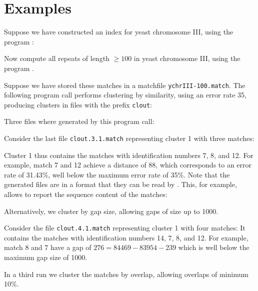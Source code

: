 \documentclass[12pt]{article}
\newcommand{\EXECUTE}[1]{}
\begin{document}
\section{Examples}

Suppose we have constructed an index for yeast chromosome III, using the
program \MKV:

\EXECUTE{mkvtree -dna -db ychrIII.fna -v -tis -ois -bwt -suf -lcp}

Now compute all repeats of length \(\geq 100\) in yeast chromosome III, using
the program \VM.

\EXECUTE{vmatch -l 100 ychrIII.fna}

Suppose we have stored these matches in a 
matchfile \texttt{ychrIII-100.match}.
The following program call performs clustering by similarity, using an 
error rate 35, producing clusters in files with the prefix \texttt{clout}:

\EXECUTE{matchcluster -erate 35 -outprefix clout ychrIII-100.match}

Three files where generated by this program call:

\EXECUTE{ls -l clout.*}

Consider the last file \texttt{clout.3.1.match} representing cluster 1
with three matches:

\EXECUTE{cat clout.3.1.match}

Cluster 1 thus contains the matches with identification
numbers 7, 8, and 12. For example, match 7 and 12 achieve a distance of 
88, which corresponds to an error rate of 31.43\%, well below the maximum error 
rate of 35\%. Note that
the generated files are in a format that they can be read by \VMS. This,
for example, allows to report the sequence content of the matches:

\EXECUTE{vmatchselect -s leftseq clout.3.1.match}

Alternatively, we cluster by gap size, allowing gaps of size up to 
1000.

\EXECUTE{matchcluster -gapsize 1000 -outprefix clout ychrIII-100.match}

Consider the file \texttt{clout.4.1.match} representing cluster 1
with four matches: It contains the matches with identification
numbers 14, 7, 8, and 12. For example, match 8 and 7 have a gap of
\(276=84469 - 83954 - 239\) which is well below the maximum gap size
of 1000.

\EXECUTE{cat clout.4.1.match}

In a third run we cluster the matches by overlap, allowing overlaps
of minimum 10\%.
\end{document}
